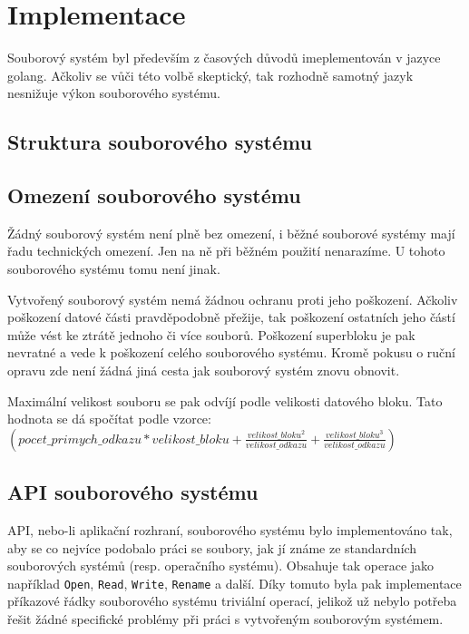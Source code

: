 \documentclass[12pt, a4paper]{article}
\begin{document}
    \section{Implementace}
    Souborový systém byl především z časových důvodů imeplementován v jazyce golang.
    Ačkoliv se vůči této volbě skeptický, tak rozhodně samotný jazyk nesnižuje výkon souborového systému.

    \subsection{Struktura souborového systému}

    \subsection{Omezení souborového systému}
    Žádný souborový systém není plně bez omezení, i běžné souborové systémy mají řadu technických omezení.
    Jen na ně při běžném použití nenarazíme.
    U tohoto souborového systému tomu není jinak.

    Vytvořený souborový systém nemá žádnou ochranu proti jeho poškození.
    Ačkoliv poškození datové části pravděpodobně přežije, tak poškození ostatních jeho částí může vést ke ztrátě jednoho či více souborů.
    Poškození superbloku je pak nevratné a vede k poškození celého souborového systému.
    Kromě pokusu o ruční opravu zde není žádná jiná cesta jak souborový systém znovu obnovit.

    Maximální velikost souboru se pak odvíjí podle velikosti datového bloku.
    Tato hodnota se dá spočítat podle vzorce:\\$(pocet\_primych\_odkazu*velikost\_bloku+\frac{velikost\_bloku^2}{velikost\_odkazu}+\frac{velikost\_bloku^3}{velikost\_odkazu})$

    \subsection{API souborového systému}
    API, nebo-li aplikační rozhraní, souborového systému bylo implementováno tak, aby se co nejvíce podobalo práci se soubory, jak jí známe ze standardních souborových systémů (resp. operačního systému).
    Obsahuje tak operace jako například \texttt{Open}, \texttt{Read}, \texttt{Write}, \texttt{Rename} a další.
    Díky tomuto byla pak implementace příkazové řádky souborového systému triviální operací, jelikož už nebylo potřeba řešit žádné specifické problémy při práci s vytvořeným souborovým systémem.
\end{document}

